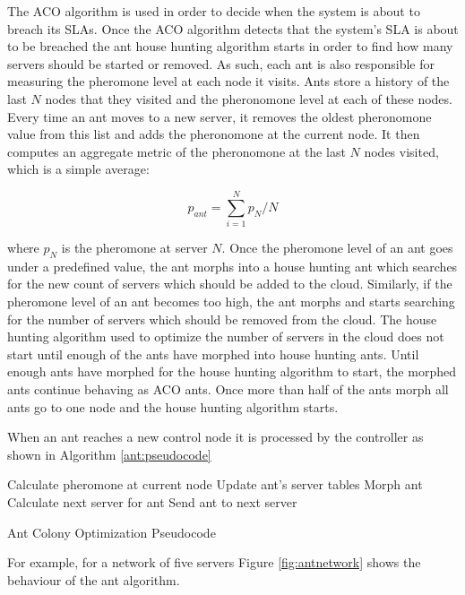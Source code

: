 The ACO algorithm is used in order to decide when the system is about to breach its SLAs. Once the ACO algorithm detects that the system's SLA is about to be breached the ant house hunting algorithm starts in order to find how many servers should be started or removed. As such, each ant is also responsible for measuring the pheromone level at each node it visits. Ants store a history of the last $N$ nodes that they visited and the pheronomone level at each of these nodes. Every time an ant moves to a new server, it removes the oldest pheronomone value from this list and adds the pheronomone at the current node. It then computes an aggregate metric of the pheronomone at the last $N$ nodes visited, which is a simple average:

\begin{equation}
p_{ant} = \sum_{i=1}^{N} p_{N} / N
\end{equation}

where $p_{N}$ is the pheromone at server $N$. Once the pheromone level of an ant goes under a predefined value, the ant morphs into a house hunting ant which searches for the new count of servers which should be added to the cloud. Similarly, if the pheromone level of an ant becomes too high, the ant morphs and starts searching for the number of servers which should be removed from the cloud. The house hunting algorithm used to optimize the number of servers in the cloud does not start until enough of the ants have morphed into house hunting ants. Until enough ants have morphed for the house hunting algorithm to start, the morphed ants continue behaving as ACO ants. Once more than half of the ants morph all ants go to one node and the house hunting algorithm starts.

When an ant reaches a new control node it is processed by the controller as shown in Algorithm \ref{ant:pseudocode}

\begin{algorithm}
\begin{algorithmic}
	\State Calculate pheromone at current node
	\State Update ant's server tables
		\State Morph ant
	\Else
		\State Calculate next server for ant
		\State Send ant to next server
	\EndIf
\end{algorithmic}
\caption{Ant Colony Optimization Pseudocode}\label{ant:pseudocode}
\end{algorithm}

For example, for a network of five servers Figure \ref{fig:antnetwork} shows the behaviour of the ant algorithm.


